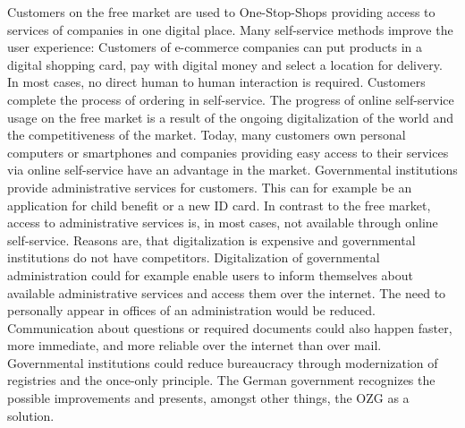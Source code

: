 \documentclass[
     12pt,         %
     a4paper,      %
     BCOR=10mm,version=first,     %
     DIV=14,version=first,        %
     ]{scrreprt}
\begin{document}
Customers on the free market are used to One-Stop-Shops providing access to services of companies in one digital place. Many self-service methods improve the user experience: Customers of e-commerce companies can put products in a digital shopping card, pay with digital money and select a location for delivery. In most cases, no direct human to human interaction is required. Customers complete the process of ordering in self-service. The progress of online self-service usage on the free market is a result of the ongoing digitalization of the world and the competitiveness of the market. Today, many customers own personal computers or smartphones and companies providing easy access to their services via online self-service have an advantage in the market.
Governmental institutions provide administrative services for customers. This can for example be an application for child benefit or a new ID card. In contrast to the free market, access to administrative services is, in most cases, not available through online self-service. Reasons are, that digitalization is expensive and governmental institutions do not have competitors.
Digitalization of governmental administration could for example enable users to inform themselves about available administrative services and access them over the internet. The need to personally appear in offices of an administration would be reduced. Communication about questions or required documents could also happen faster, more immediate, and more reliable over the internet than over mail. Governmental institutions could reduce bureaucracy through modernization of registries and the once-only principle.
The German government recognizes the possible improvements and presents, amongst other things, the OZG as a solution. \cite{IT-Planungsrat:Herausforderung}
\end{document}
